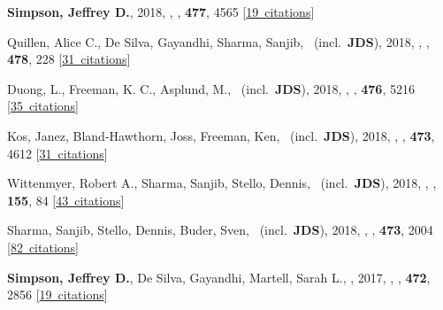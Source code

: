 \item[{\color{numcolor}\scriptsize18}] \textbf{Simpson, Jeffrey D.}, 2018, , \mnras, \textbf{477}, 4565 [\href{https://ui.adsabs.harvard.edu/#abs/2018MNRAS.477.4565S}{19~citations}]

\item[{\color{numcolor}\scriptsize17}] Quillen, Alice C., De Silva, Gayandhi, Sharma, Sanjib, \etal\ (incl.\ \textbf{JDS}), 2018, , \mnras, \textbf{478}, 228 [\href{https://ui.adsabs.harvard.edu/#abs/2018MNRAS.478..228Q}{31~citations}]

\item[{\color{numcolor}\scriptsize16}] Duong, L., Freeman, K. C., Asplund, M., \etal\ (incl.\ \textbf{JDS}), 2018, , \mnras, \textbf{476}, 5216 [\href{https://ui.adsabs.harvard.edu/#abs/2018MNRAS.476.5216D}{35~citations}]

\item[{\color{numcolor}\scriptsize15}] Kos, Janez, Bland-Hawthorn, Joss, Freeman, Ken, \etal\ (incl.\ \textbf{JDS}), 2018, , \mnras, \textbf{473}, 4612 [\href{https://ui.adsabs.harvard.edu/#abs/2018MNRAS.473.4612K}{31~citations}]

\item[{\color{numcolor}\scriptsize14}] Wittenmyer, Robert A., Sharma, Sanjib, Stello, Dennis, \etal\ (incl.\ \textbf{JDS}), 2018, , \aj, \textbf{155}, 84 [\href{https://ui.adsabs.harvard.edu/#abs/2018AJ....155...84W}{43~citations}]

\item[{\color{numcolor}\scriptsize13}] Sharma, Sanjib, Stello, Dennis, Buder, Sven, \etal\ (incl.\ \textbf{JDS}), 2018, , \mnras, \textbf{473}, 2004 [\href{https://ui.adsabs.harvard.edu/#abs/2018MNRAS.473.2004S}{82~citations}]

\item[{\color{numcolor}\scriptsize12}] \textbf{Simpson, Jeffrey D.}, De Silva, Gayandhi, Martell, Sarah L., \etal, 2017, , \mnras, \textbf{472}, 2856 [\href{https://ui.adsabs.harvard.edu/#abs/2017MNRAS.472.2856S}{19~citations}]

